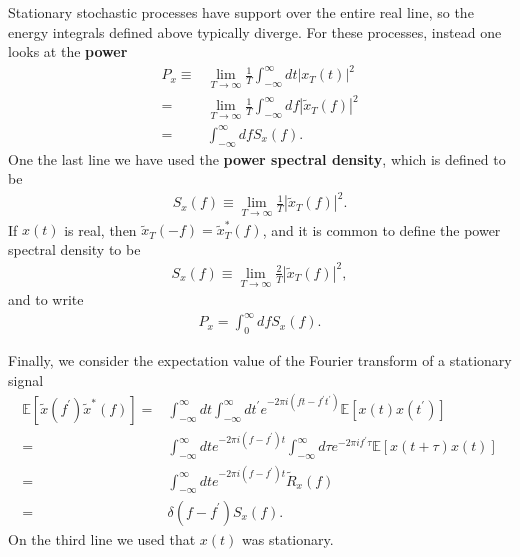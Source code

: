 Stationary stochastic processes have support over the entire real line, 
so the energy integrals defined above typically diverge. 
For these processes, instead one looks at the \textbf{power}
\begin{align}
    P_{x}
    \equiv&
    \lim_{T\to\infty}\frac{1}{T}\int_{-\infty}^{\infty}dt \left|x_T\left(t\right)\right|^2
    \nonumber\\
    =&
    \lim_{T\to\infty}\frac{1}{T}\int_{-\infty}^{\infty}df \left|\tilde{x}_T\left(f\right)\right|^2
    \nonumber\\
    =&
    \int_{-\infty}^{\infty}df S_x\left(f\right) 
    .
\end{align}
One the last line we have used the \textbf{power spectral density}, 
which is defined to be
\begin{align}
    \label{eq:power-spectral-density}
    S_{x}\left(f\right)
    \equiv
    \lim_{T\to\infty}\frac{1}{T}\left|\tilde{x}_T\left(f\right)\right|^2
    .
\end{align}
If $x(t)$ is real, then $\tilde{x}_T\left(-f\right)=\tilde{x}^*_T\left(f\right)$, and
it is common to define the power spectral density to be
\begin{align}
    S_x\left(f\right)
    \equiv
    \lim_{T\to\infty}\frac{2}{T}\left|\tilde{x}_T\left(f\right)\right|^2
    ,
\end{align}
and to write
\begin{align}
    P_x
    =
    \int_0^{\infty}df S_x\left(f\right)
    .
\end{align}

Finally, we consider the expectation value of the Fourier transform
of a stationary signal
\begin{align}
    \mathbb{E}\left[\tilde{x}\left(f^{\prime}\right)\tilde{x}^*\left(f\right)\right]
    =&
    \int_{-\infty}^{\infty}dt \int_{-\infty}^{\infty}dt^{\prime}
        e^{- 2\pi i \left(f t - f^{\prime}t^{\prime}\right)}
        \mathbb{E}\left[x\left(t\right)x\left(t^{\prime}\right)\right]
    \nonumber\\
    =&
    \int_{-\infty}^{\infty}dt e^{-2\pi i \left(f-f^{\prime}\right)t}
    \int_{-\infty}^{\infty}d\tau e^{-2\pi i f^{\prime}\tau}
        \mathbb{E}\left[x\left(t+\tau\right)x\left(t\right)\right]
    \nonumber\\
    =&
    \int_{-\infty}^{\infty}dt e^{-2\pi i \left(f-f^{\prime}\right)t}
        \tilde{R}_x\left(f\right) 
    \nonumber\\
    =&
    \delta\left(f-f^{\prime}\right)S_x\left(f\right) 
    .
\end{align}
On the third line we used that $x(t)$ was stationary.

